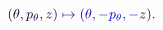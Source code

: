 \documentclass[12pt]{article}
\begin{document}
\makeatletter
\renewcommand*{\@textcolor}[3]{%
  \protect\leavevmode
  \begingroup
    \color#1{#2}#3%
  \endgroup
}
\makeatother
\begin{displaymath}
\mathcolor[RGB]{0,0,15}{(} \mathcolor[RGB]{0,0,30}{\theta} \mathcolor[RGB]{0,0,45}{,} \mathcolor[RGB]{0,0,60}{p} _ { \mathcolor[RGB]{0,0,75}{\theta} } \mathcolor[RGB]{0,0,90}{,} \mathcolor[RGB]{0,0,105}{z} \mathcolor[RGB]{0,0,120}{)} \mathcolor[RGB]{0,0,135}{\mapsto} \mathcolor[RGB]{0,0,150}{(} \mathcolor[RGB]{0,0,165}{\theta} \mathcolor[RGB]{0,0,180}{,} \mathcolor[RGB]{0,0,195}{-} \mathcolor[RGB]{0,0,210}{p} _ { \mathcolor[RGB]{0,0,225}{\theta} } \mathcolor[RGB]{0,0,240}{,} \mathcolor[RGB]{0,0,255}{-} \mathcolor[RGB]{0,15,0}{z} \mathcolor[RGB]{0,15,15}{)} \mathcolor[RGB]{0,15,30}{.}
\end{displaymath}
\end{document}
